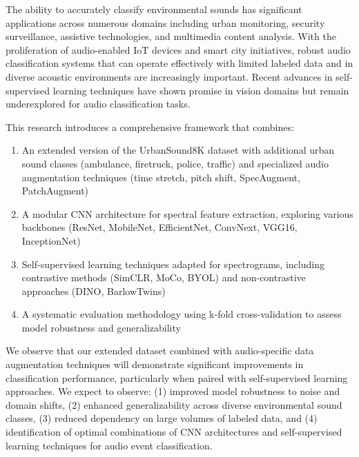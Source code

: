 \documentclass[11pt]{article}
\begin{document}
The ability to accurately classify environmental sounds has significant applications across numerous domains including urban monitoring, security surveillance, assistive technologies, and multimedia content analysis. With the proliferation of audio-enabled IoT devices and smart city initiatives, robust audio classification systems that can operate effectively with limited labeled data and in diverse acoustic environments are increasingly important. Recent advances in self-supervised learning techniques have shown promise in vision domains but remain underexplored for audio classification tasks.

This research introduces a comprehensive framework that combines:

\begin{enumerate}
    \item An extended version of the UrbanSound8K dataset with additional urban sound classes (ambulance, firetruck, police, traffic) and specialized audio augmentation techniques (time stretch, pitch shift, SpecAugment, PatchAugment)
    \item A modular CNN architecture for spectral feature extraction, exploring various backbones (ResNet, MobileNet, EfficientNet, ConvNext, VGG16, InceptionNet)
    \item Self-supervised learning techniques adapted for spectrograms, including contrastive methods (SimCLR, MoCo, BYOL) and non-contrastive approaches (DINO, BarlowTwins)
    \item A systematic evaluation methodology using k-fold cross-validation to assess model robustness and generalizability
\end{enumerate}
We observe that our extended dataset combined with audio-specific data augmentation techniques will demonstrate significant improvements in classification performance, particularly when paired with self-supervised learning approaches. We expect to observe: (1) improved model robustness to noise and domain shifts, (2) enhanced generalizability across diverse environmental sound classes, (3) reduced dependency on large volumes of labeled data, and (4) identification of optimal combinations of CNN architectures and self-supervised learning techniques for audio event classification.
\end{document}
